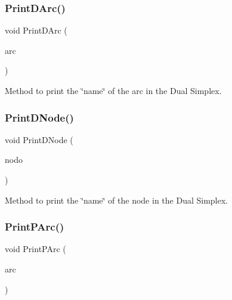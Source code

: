\subsubsection{\texorpdfstring{Print\+D\+Arc()}{PrintDArc()}}
{\footnotesize\ttfamily void Print\+D\+Arc (\begin{DoxyParamCaption}\item[{\mbox{\hyperlink{struct_m_c_f_simplex_1_1arc_d_type}{arc\+D\+Type}} $\ast$}]{arc }\end{DoxyParamCaption})\hspace{0.3cm}{\ttfamily [private]}}

Method to print the \char`\"{}name\char`\"{} of the arc in the Dual Simplex. \mbox{\label{class_m_c_f_simplex_a55930c644c916a627a4eb7ff5c965e2a}} 
\subsubsection{\texorpdfstring{Print\+D\+Node()}{PrintDNode()}}
{\footnotesize\ttfamily void Print\+D\+Node (\begin{DoxyParamCaption}\item[{\mbox{\hyperlink{struct_m_c_f_simplex_1_1node_d_type}{node\+D\+Type}} $\ast$}]{nodo }\end{DoxyParamCaption})\hspace{0.3cm}{\ttfamily [private]}}

Method to print the \char`\"{}name\char`\"{} of the node in the Dual Simplex. \mbox{\label{class_m_c_f_simplex_aafe9e93544458aaf8bcb90c0c885e615}} 
\subsubsection{\texorpdfstring{Print\+P\+Arc()}{PrintPArc()}}
{\footnotesize\ttfamily void Print\+P\+Arc (\begin{DoxyParamCaption}\item[{\mbox{\hyperlink{struct_m_c_f_simplex_1_1arc_p_type}{arc\+P\+Type}} $\ast$}]{arc }\end{DoxyParamCaption})\hspace{0.3cm}{\ttfamily [private]}}

